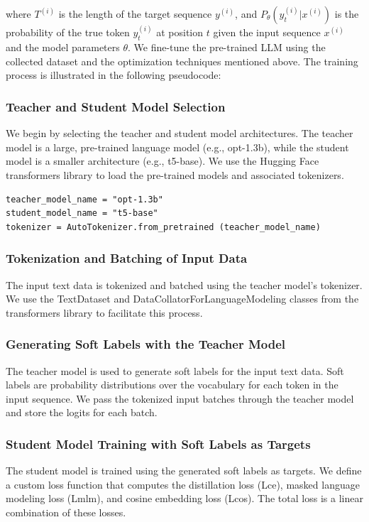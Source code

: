 \documentclass[letterpaper]{article}
\begin{document}
where $T^{(i)}$ is the length of the target sequence $y^{(i)}$, and $P_\theta(y_t^{(i)} | x^{(i)})$ is the probability of the true token $y_t^{(i)}$ at position $t$ given the input sequence $x^{(i)}$ and the model parameters $\theta$. We fine-tune the pre-trained LLM using the collected dataset and the optimization techniques mentioned above. The training process is illustrated in the following pseudocode:



\subsubsection{Teacher and Student Model Selection}
We begin by selecting the teacher and student model architectures. The teacher model is a large, pre-trained language model (e.g., opt-1.3b), while the student model is a smaller architecture (e.g., t5-base). We use the Hugging Face transformers library to load the pre-trained models and associated tokenizers.
\begin{lstlisting}
teacher_model_name = "opt-1.3b"
student_model_name = "t5-base"
tokenizer = AutoTokenizer.from_pretrained (teacher_model_name)
\end{lstlisting}
\subsubsection{Tokenization and Batching of Input Data}
The input text data is tokenized and batched using the teacher model's tokenizer. We use the TextDataset and DataCollatorForLanguageModeling classes from the transformers library to facilitate this process.
\subsubsection{Generating Soft Labels with the Teacher Model}
The teacher model is used to generate soft labels for the input text data. Soft labels are probability distributions over the vocabulary for each token in the input sequence. We pass the tokenized input batches through the teacher model and store the logits for each batch.
\subsubsection{Student Model Training with Soft Labels as Targets}
The student model is trained using the generated soft labels as targets. We define a custom loss function that computes the distillation loss (Lce), masked language modeling loss (Lmlm), and cosine embedding loss (Lcos). The total loss is a linear combination of these losses.
\end{document}
